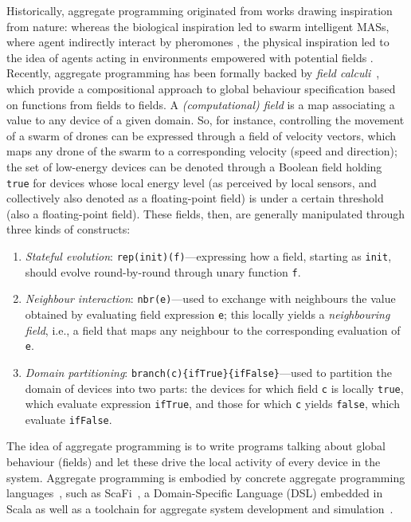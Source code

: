 \documentclass[11pt]{article}
\begin{document}
Historically, aggregate programming originated from works drawing inspiration from nature: whereas the biological inspiration led to swarm intelligent MASs, where agent indirectly interact by pheromones \cite{DBLP:conf/atal/ParunakBS02}, the physical inspiration led to the idea of agents acting in environments empowered with potential fields \cite{DBLP:books/daglib/0015276}.
%
Recently, aggregate programming has been formally backed by \emph{field calculi}~\cite{viroli2019jlamp-si-coord}, which provide a compositional approach
 to global behaviour specification
 based on functions from fields to fields.
%
A \emph{(computational) field} is a map associating a value to any device of a given domain.
%
So, for instance, controlling the movement of a swarm of drones can be expressed through a field of velocity vectors, which maps any drone of the swarm to a corresponding velocity (speed and direction); the set of low-energy devices can be denoted through a Boolean field holding \texttt{true} for devices whose local energy level (as perceived by local sensors, and collectively also denoted as a floating-point field) is under a certain threshold (also a floating-point field).
%
These fields, then, are generally manipulated through three kinds of constructs:
\begin{enumerate}
\item \emph{Stateful evolution}: \lstinline|rep(init)(f)|---expressing how a field, starting as \lstinline|init|, should evolve round-by-round through unary function \lstinline|f|.
\item \emph{Neighbour interaction}: \lstinline|nbr(e)|---used to exchange with neighbours the value obtained by evaluating field expression \lstinline|e|; this locally yields a \emph{neighbouring field}, i.e., a field that maps any neighbour to the corresponding evaluation of \lstinline|e|.
\item \emph{Domain partitioning}: \lstinline|branch(c){ifTrue}{ifFalse}|---used to partition the domain of devices into two parts: the devices for which field \lstinline|c| is locally \lstinline|true|, which evaluate expression \lstinline|ifTrue|, and those for which \lstinline|c| yields \lstinline|false|, which evaluate \lstinline|ifFalse|. 
\end{enumerate}
%
The idea of aggregate programming is to 
 write programs talking about global behaviour (fields)
 and let these drive the local activity of every device in the system.
%
Aggregate programming is embodied by concrete aggregate programming languages~\cite{viroli2019jlamp-si-coord},
 such as ScaFi~\cite{DBLP:conf/isola/CasadeiVAD20,DBLP:journals/eaai/CasadeiVAPD21},
 a Domain-Specific Language (DSL) embedded in Scala
 as well as a toolchain for aggregate system development and simulation~\cite{Casadei2016mass}.
%
\end{document}
